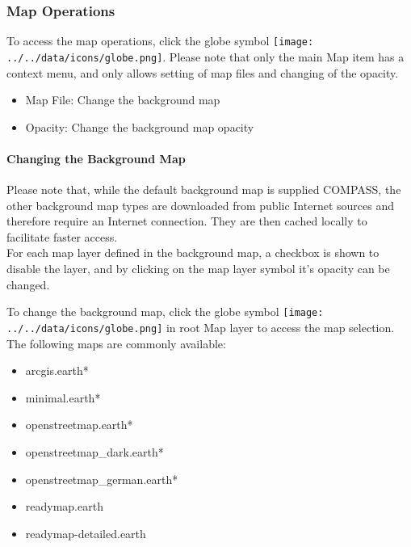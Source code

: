 \subsubsection{Map Operations}
\label{ref:geoview_map_ops}

To access the map operations, click the globe symbol \texttt{[image: ../../data/icons/globe.png]}. Please note that only the main Map item has a context menu, and only allows setting of map files and changing of the opacity.

\begin{itemize}
 \item Map File: Change the background map
 \item Opacity: Change the background map opacity
\end{itemize} 

\paragraph{Changing the Background Map}

Please note that, while the default background map is supplied COMPASS, the other background map types are downloaded from public Internet sources and therefore require an Internet connection. They are then cached locally to facilitate faster access. \\

For each map layer defined in the background map, a checkbox is shown to disable the layer, and by clicking on the map layer symbol it's opacity can be changed.

To change the background map, click the globe symbol \texttt{[image: ../../data/icons/globe.png]} in root Map layer to access the map selection. \\

The following maps are commonly available:

\begin{itemize}
 \item arcgis.earth*
 \item minimal.earth*
 \item openstreetmap.earth*
 \item openstreetmap\_dark.earth*
 \item openstreetmap\_german.earth*
 \item readymap.earth
 \item readymap-detailed.earth
\end{itemize}
 \ \\
 
